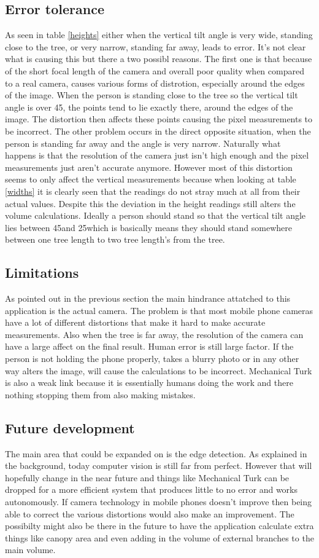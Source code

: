 \subsection{Error tolerance}
As seen in table \ref{heights} either when the vertical tilt angle is very wide, standing close to the tree, or very narrow, standing far away, leads to error. It's not clear what is causing this but there a two possibl reasons. The first one is that because of the short focal length of the camera and overall poor quality when compared to a real camera, causes various forms of distrotion, especially around the edges of the image. When the person is standing close to the tree so the vertical tilt angle is over 45\degree, the points tend to lie exactly there, around the edges of the image. The distortion then affects these points causing the pixel measurements to be incorrect. The other problem occurs in the direct opposite situation, when the person is standing far away and the angle is very narrow. Naturally what happens is that the resolution of the camera just isn't high enough and the pixel measurements just aren't accurate anymore. However most of this distortion seems to only affect the vertical measurements because when looking at table \ref{widths} it is clearly seen that the readings do not stray much at all from their actual values. Despite this the deviation in the height readings still alters the volume calculations. Ideally a person should stand so that the vertical tilt angle lies between 45\degree and 25\degree which is basically means they should stand somewhere between one tree length to two tree length's from the tree.
\subsection{Limitations}
As pointed out in the previous section the main hindrance attatched to this application is the actual camera. The problem is that most mobile phone cameras have a lot of different distortions that make it hard to make accurate measurements. Also when the tree is far away, the resolution of the camera can have a large affect on the final result. Human error is still large factor. If the person is not holding the phone properly, takes a blurry photo or in any other way alters the image, will cause the calculations to be incorrect. Mechanical Turk is also a weak link because it is essentially humans doing the work and there nothing stopping them from also making mistakes. 
\subsection{Future development}
The main area that could be expanded on is the edge detection. As explained in the background, today computer vision is still far from perfect. However that will hopefully change in the near future and things like Mechanical Turk can be dropped for a more efficient system that produces little to no error and works autonomously. If camera technology in mobile phones doesn't improve then being able to correct the various distortions would also make an improvement. The possibilty might also be there in the future to have the application calculate extra things like canopy area and even adding in the volume of external branches to the main volume. 

